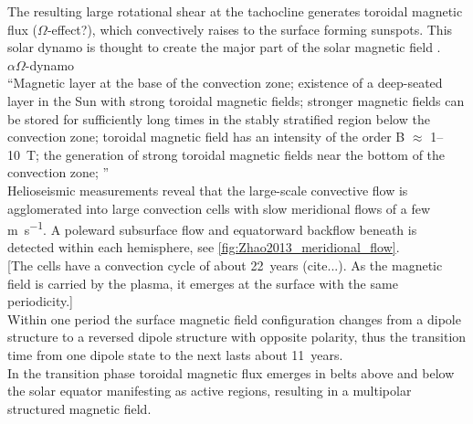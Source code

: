 The resulting large rotational shear at the tachocline generates toroidal magnetic flux ($\Omega$-effect?), which convectively raises to the surface forming sunspots. This solar dynamo is thought to create the major part of the solar magnetic field \citep{Miesch2005}.\\	%

$\alpha\Omega$-dynamo\\

``Magnetic layer at the base of the convection zone; existence of a deep-seated layer in the Sun with strong toroidal magnetic fields; stronger magnetic fields can be stored for sufficiently long times in the stably stratified region below the convection zone; toroidal magnetic field has an intensity of the order B $\approx$ 1--10~T; the generation of strong toroidal magnetic fields near the bottom of the convection zone; '' \citep{Ossendrijver2003}\\

Helioseismic measurements reveal that the large-scale convective flow is agglomerated into large convection cells with slow meridional flows of a few \si{\m\per\s}. A poleward subsurface flow and equatorward backflow beneath is detected within each hemisphere, see \autoref{fig:Zhao2013_meridional_flow}.\\

[The cells have a convection cycle of about 22~years (cite...). As the magnetic field is carried by the plasma, it emerges at the surface with the same periodicity.]\\

Within one period the surface magnetic field configuration changes from a dipole structure to a reversed dipole structure with opposite polarity, thus the transition time from one dipole state to the next lasts about 11~years.\\

In the transition phase toroidal magnetic flux emerges in belts above and below the solar equator manifesting as active regions, resulting in a multipolar structured magnetic field.\\


